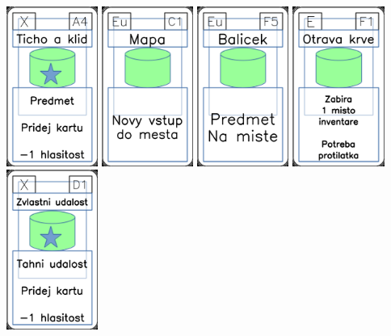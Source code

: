 \documentclass[a4paper]{article}
\begin{document}
	\includegraphics[width=3.0cm]{img-5_3}
	\includegraphics[width=3.0cm]{img-4_40}
	\includegraphics[width=3.0cm]{img-4_29}
	\includegraphics[width=3.0cm]{img-4_55}
	\includegraphics[width=3.0cm]{img-5_15}
\end{document}
